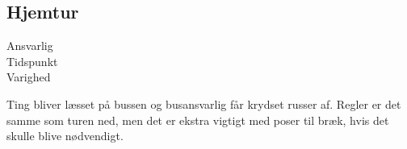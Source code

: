 \documentclass[../../../main.tex]{subfiles}
\begin{document}
\subsection{Hjemtur}

\begin{description}
\item[Ansvarlig] \placeholder
\item[Tidspunkt] \placeholder
\item[Varighed] \placeholder
\end{description}

Ting bliver læsset på bussen og busansvarlig får krydset russer af. Regler er det samme som turen ned, men det er ekstra vigtigt med poser til bræk, hvis det skulle blive nødvendigt.
\end{document}
